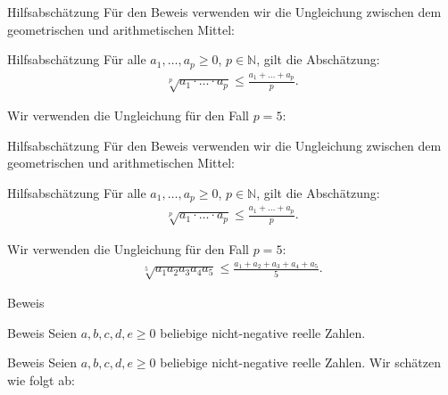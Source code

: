 \documentclass[10pt]{beamer}
\def\bN{\mathbb{N}}
\begin{document}
\begin{frame}{Hilfsabschätzung}
    Für den Beweis verwenden wir die Ungleichung zwischen dem geometrischen und arithmetischen Mittel:
    \begin{block}{Hilfsabschätzung}
        Für alle \( a_{1}, \ldots, a_{p} \geq 0 \), \( p \in \bN \), gilt die Abschätzung:
        \begin{align*}
            \sqrt[p]{a_{1} \cdot \ldots \cdot a_{p}} 
            \leq \frac{a_{1} + \ldots + a_{p}}{p}.
        \end{align*}
    \end{block}
    Wir verwenden die Ungleichung für den Fall \( p = 5 \):
\end{frame}



\begin{frame}{Hilfsabschätzung}
    Für den Beweis verwenden wir die Ungleichung zwischen dem geometrischen und arithmetischen Mittel:
    \begin{block}{Hilfsabschätzung}
        Für alle \( a_{1}, \ldots, a_{p} \geq 0 \), \( p \in \bN \), gilt die Abschätzung:
        \begin{align*}
            \sqrt[p]{a_{1} \cdot \ldots \cdot a_{p}} 
            \leq \frac{a_{1} + \ldots + a_{p}}{p}.
        \end{align*}
    \end{block}
    Wir verwenden die Ungleichung für den Fall \( p = 5 \):
    \begin{align*}
        \sqrt[5]{a_{1} a_{2} a_{3} a_{4} a_{5}} 
        \leq \frac{a_{1} + a_{2} + a_{3} + a_{4} + a_{5}}{5}.
    \end{align*}
\end{frame}



\begin{frame}{Beweis}
    
\end{frame}



\begin{frame}{Beweis}
    Seien \( a, b, c, d, e \geq 0 \) beliebige nicht-negative reelle Zahlen. 
\end{frame}



\begin{frame}{Beweis}
    Seien \( a, b, c, d, e \geq 0 \) beliebige nicht-negative reelle Zahlen. Wir schätzen wie folgt ab: 
\end{frame}
\end{document}
